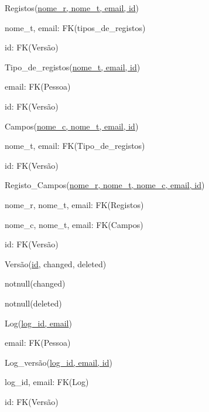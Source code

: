 \documentclass[11pt,a4paper]{article}
\begin{document}
\begin{description}[noitemsep]
	\item Registos(\underline{nome\_r, nome\_t, email, id})
	\item nome\_t, email: FK(tipos\_de\_registos)
	\item id: FK(Vers\~{a}o)
\end{description}

\begin{description}[noitemsep]
	\item Tipo\_de\_registos(\underline{nome\_t, email, id})
	\item email: FK(Pessoa)
	\item id: FK(Vers\~{a}o)
\end{description}
\newpage

\begin{description}[noitemsep]
	\item Campos(\underline{nome\_c, nome\_t, email, id})
	\item nome\_t, email: FK(Tipo\_de\_registos)
	\item id: FK(Vers\~{a}o)
\end{description}

\begin{description}[noitemsep]
	\item Registo\_Campos(\underline{nome\_r, nome\_t, nome\_c, email, id})
	\item nome\_r, nome\_t, email: FK(Registos)
	\item nome\_c, nome\_t, email: FK(Campos)
	\item id: FK(Vers\~{a}o)
\end{description}


\begin{description}[noitemsep]
	\item Vers\~{a}o(\underline{id}, changed, deleted)
	\item notnull(changed)
	\item notnull(deleted)
\end{description}

\begin{description}[noitemsep]
	\item Log(\underline{log\_id, email})
	\item email: FK(Pessoa)
\end{description}

\begin{description}[noitemsep]
	\item Log\_vers\~{a}o(\underline{log\_id, email, id})
	\item log\_id, email: FK(Log)
	\item id: FK(Vers\~{a}o)
\end{description}
\end{document}
